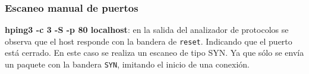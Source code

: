 \subsubsection*{Escaneo manual de puertos}

\textbf{hping3 -c 3 -S -p 80 localhost}: en la salida del analizador de protocolos se observa que el host responde con la bandera de \texttt{reset}. Indicando que el puerto está cerrado. En este caso se realiza un escaneo de tipo SYN. Ya que sólo se envía un paquete con la bandera \texttt{SYN}, imitando el inicio de una conexión.


\pagebreak


\newpage
\printbibliography









